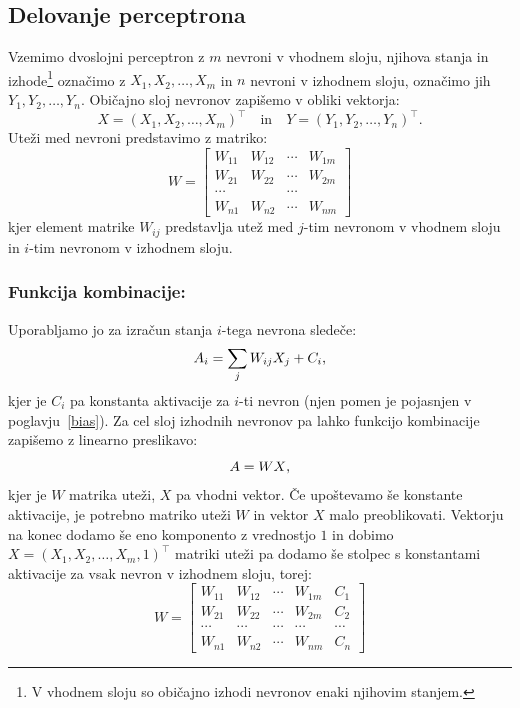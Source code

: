 \documentclass[mat1]{fmfdelo}
\begin{document}
\subsection{Delovanje perceptrona}
Vzemimo dvoslojni perceptron z $m$ nevroni v vhodnem sloju, njihova stanja in izhode\footnote{V vhodnem sloju so običajno izhodi nevronov enaki njihovim stanjem.} označimo z $X_1, X_2, \ldots, X_m$ in $n$ nevroni v izhodnem sloju, označimo jih $Y_1, Y_2, \ldots, Y_{n}$. Običajno sloj nevronov zapišemo v obliki vektorja:
%
\begin{equation*}
X = (X_1, X_2, \dotso, X_m)^\intercal  \quad \text{in} \quad  Y = (Y_1, Y_2, \dotso, Y_n)^\intercal \text{.}
\end{equation*}
%
Uteži med nevroni predstavimo z matriko:
%
\begin{equation*}
W = \begin{bmatrix}
W_{11} &W_{12}  & \cdots & W_{1m}  \\
W_{21}  &W_{22}  &\cdots & W_{2m}  \\
\cdots &  &\cdots &  \\
W_{n1} & W_{n2} & \cdots & W_{nm} 
\end{bmatrix}  
\end{equation*}
%
kjer element matrike $W_{ij}$ predstavlja utež med $j$-tim nevronom v vhodnem sloju in $i$-tim nevronom v izhodnem sloju.
%
\subsubsection{Funkcija kombinacije:}
Uporabljamo jo za izračun stanja $i$-tega nevrona sledeče:
%
\begin{equation*}
A_i= \sum_{j}W_{ij}X_j + C_i \text,
\end{equation*}
%
kjer je  $C_i$ pa konstanta aktivacije za $i$-ti nevron (njen pomen je pojasnjen v poglavju~\ref{bias}). 
Za cel sloj izhodnih nevronov pa lahko funkcijo kombinacije zapišemo z linearno preslikavo:
%
\begin{equation*}
A = WX \text,
\end{equation*}
%
kjer je $W$ matrika uteži, $X$ pa vhodni vektor. Če upoštevamo še konstante aktivacije, je potrebno matriko uteži $W$ in vektor $X$ malo preoblikovati. Vektorju na konec dodamo še eno komponento z vrednostjo $1$ in dobimo $X =  (X_1, X_2, \dotso, X_m, 1)^\intercal $ matriki uteži pa dodamo še stolpec s konstantami aktivacije za vsak nevron v izhodnem sloju, torej: 
%
\begin{equation*}
W = \begin{bmatrix}
W_{11} &W_{12}  & \cdots & W_{1m}  & C_1\\
W_{21}  &W_{22}  &\cdots & W_{2m}  & C_2\\
\cdots &\cdots  &\cdots &\cdots  &\cdots\\
W_{n1} & W_{n2} & \cdots & W_{nm} & C_n
\end{bmatrix}  
\end{equation*}
%
\end{document}
